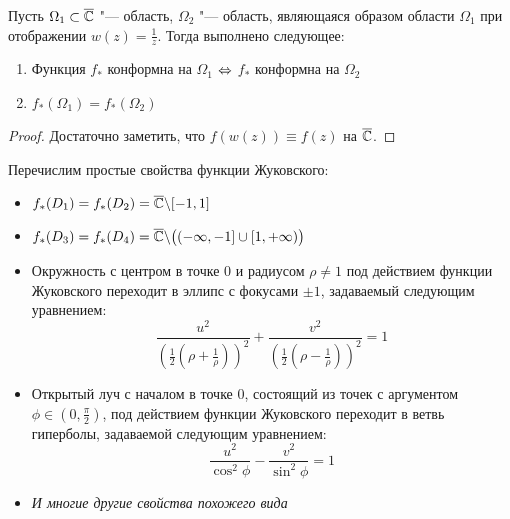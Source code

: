 \begin{proposition}
	Пусть $\Omega_1 \subset \overline{\mathbb{C}}$ "--- область, $\Omega_2$ "--- область, являющаяся образом области $\Omega_1$ при отображении $w(z) = \frac 1z$. Тогда выполнено следующее:
	\begin{enumerate}
		\item Функция $f_*$ конформна на $\Omega_1$ $\Leftrightarrow$ $f_*$ конформна на $\Omega_2$
		\item $f_*(\Omega_1) = f_*(\Omega_2)$
	\end{enumerate}
\end{proposition}

\begin{proof}
	Достаточно заметить, что $f(w(z)) \equiv f(z)$ на $\overline{\mathbb{C}}$.
\end{proof}

\begin{note}
	Перечислим простые свойства функции Жуковского:
	\begin{itemize}
		\item $f_*(D_1) = f_*(D_2) = \overline{\mathbb{C}} \backslash [-1, 1]$
		\item $f_*(D_3) = f_*(D_4) = \overline{\mathbb{C}} \backslash \big((-\infty, -1] \cup [1, +\infty)\big)$
		\item Окружность с центром в точке $0$ и радиусом $\rho \ne 1$ под действием функции Жуковского переходит в эллипс с фокусами $\pm 1$, задаваемый следующим уравнением:
		\[\frac{u^2}{\left(\frac12\left(\rho + \frac 1\rho\right)\right)^2} + \frac{v^2}{\left(\frac12\left(\rho - \frac 1\rho\right)\right)^2} = 1\]
		\item Открытый луч с началом в точке $0$, состоящий из точек с аргументом $\phi \in \left(0, \frac\pi 2\right)$, под действием функции Жуковского переходит в ветвь гиперболы, задаваемой следующим уравнением:
		\[\frac{u^2}{\cos^2\phi} - \frac{v^2}{\sin^2\phi} = 1\]
		\item \textit{И многие другие свойства похожего вида}
	\end{itemize}
\end{note}